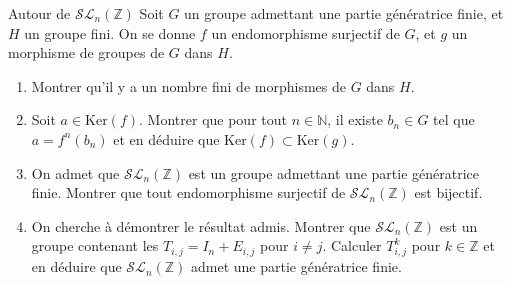 \documentclass[french]{book}
\newcommand{\N}{\mathbb{N}}
\newcommand{\Z}{\mathbb{Z}}
\renewcommand{\ker}{\text{Ker}}
\theoremstyle{definition}
\theoremstyle{remark}
\begin{document}
\begin{exo}[3]{Autour de $\mathcal{SL}_n(\Z)$}
	Soit $G$ un groupe admettant une partie génératrice finie, et $H$ un groupe fini. On se donne $f$ un endomorphisme surjectif de $G$, et $g$ un morphisme de groupes de $G$ dans $H$.
	\begin{enumerate}
		\item Montrer qu'il y a un nombre fini de morphismes de $G$ dans $H$.
		\item Soit $a\in\ker(f)$. Montrer que pour tout $n\in\N$, il existe $b_n\in G$ tel que $a=f^n(b_n)$ et en déduire que $\ker(f)\subset\ker(g)$.
		\item On admet que $\mathcal{SL}_n(\Z)$ est un groupe admettant une partie génératrice finie. Montrer que tout endomorphisme surjectif de $\mathcal{SL}_n(\Z)$ est bijectif.
		\item On cherche à démontrer le résultat admis. Montrer que $\mathcal{SL}_n(\Z)$ est un groupe contenant les $T_{i,j}=I_n+E_{i,j}$ pour $i\ne j$. Calculer $T_{i,j}^k$ pour $k\in\Z$ et en déduire que $\mathcal{SL}_n(\Z)$ admet une partie génératrice finie.
	\end{enumerate}
\end{exo}
\end{document}
